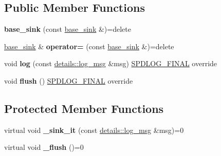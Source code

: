\subsection*{Public Member Functions}
\begin{DoxyCompactItemize}
\item 
{\bfseries base\+\_\+sink} (const \hyperlink{classspdlog_1_1sinks_1_1base__sink}{base\+\_\+sink} \&)=delete\hypertarget{classspdlog_1_1sinks_1_1base__sink_a9639062f2ce3598203c0d958576491d1}{}\label{classspdlog_1_1sinks_1_1base__sink_a9639062f2ce3598203c0d958576491d1}

\item 
\hyperlink{classspdlog_1_1sinks_1_1base__sink}{base\+\_\+sink} \& {\bfseries operator=} (const \hyperlink{classspdlog_1_1sinks_1_1base__sink}{base\+\_\+sink} \&)=delete\hypertarget{classspdlog_1_1sinks_1_1base__sink_a1b99823aeb2513a891bba168639421a9}{}\label{classspdlog_1_1sinks_1_1base__sink_a1b99823aeb2513a891bba168639421a9}

\item 
void {\bfseries log} (const \hyperlink{structspdlog_1_1details_1_1log__msg}{details\+::log\+\_\+msg} \&msg) \hyperlink{classspdlog_1_1sinks_1_1SPDLOG__FINAL}{S\+P\+D\+L\+O\+G\+\_\+\+F\+I\+N\+AL} override\hypertarget{classspdlog_1_1sinks_1_1base__sink_a2f435e651390945c4dd35df148b1a5eb}{}\label{classspdlog_1_1sinks_1_1base__sink_a2f435e651390945c4dd35df148b1a5eb}

\item 
void {\bfseries flush} () \hyperlink{classspdlog_1_1sinks_1_1SPDLOG__FINAL}{S\+P\+D\+L\+O\+G\+\_\+\+F\+I\+N\+AL} override\hypertarget{classspdlog_1_1sinks_1_1base__sink_a546c8690d7dadcba0bd716fc2d767a0b}{}\label{classspdlog_1_1sinks_1_1base__sink_a546c8690d7dadcba0bd716fc2d767a0b}

\end{DoxyCompactItemize}
\subsection*{Protected Member Functions}
\begin{DoxyCompactItemize}
\item 
virtual void {\bfseries \+\_\+sink\+\_\+it} (const \hyperlink{structspdlog_1_1details_1_1log__msg}{details\+::log\+\_\+msg} \&msg)=0\hypertarget{classspdlog_1_1sinks_1_1base__sink_a7a81101ba8dc0e19c77587c2a1e602ea}{}\label{classspdlog_1_1sinks_1_1base__sink_a7a81101ba8dc0e19c77587c2a1e602ea}

\item 
virtual void {\bfseries \+\_\+flush} ()=0\hypertarget{classspdlog_1_1sinks_1_1base__sink_a042217f781473c1f5a55d61dde6f2565}{}\label{classspdlog_1_1sinks_1_1base__sink_a042217f781473c1f5a55d61dde6f2565}

\end{DoxyCompactItemize}
